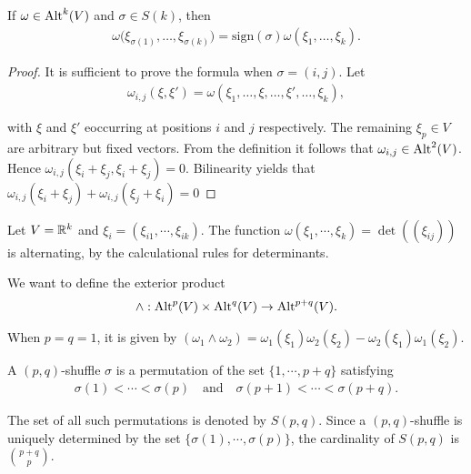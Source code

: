 \begin{lemma}
  If $\omega\in\operatorname{Alt}^k(V)$ and $\sigma\in S(k)$, then
  \begin{align*}
    \omega\big(\xi_{\sigma(1)},\ldots,\xi_{\sigma(k)}\big)=\mathrm{sign}(\sigma)\omega(\xi_{1},\ldots,\xi_{k}).
  \end{align*}
\end{lemma}

\begin{proof}
  It is sufficient to prove the formula when $\sigma = (i, j)$. Let
  \begin{align*}
    \omega_{i,j}(\xi,\xi')=\omega(\xi_{1},\ldots,\xi,\ldots,\xi',\ldots,\xi_{k}),
  \end{align*}

  with $\xi$ and $\xi'$ eoccurring at positions $i$ and $j$ respectively. The remaining $\xi_p\in V$
  are arbitrary but fixed vectors. From the definition it follows that $\omega_{i,j}\in\operatorname{Alt}^2(V)$.
  Hence $\omega_{i,j} (\xi_i + \xi_j, \xi_i + \xi_j) = 0$. Bilinearity yields that
  $\omega_{i,j} (\xi_i + \xi_j) + \omega_{i,j} (\xi_j + \xi_i) = 0$
\end{proof}


\begin{example}\label{example:2-3}
  Let $V = \mathbb{R}^k$ and $\xi_i = (\xi_{i1}, \cdots, \xi_{ik})$. The function $\omega(\xi_1, \cdots, \xi_k) = \det((\xi_{ij}))$
  is alternating, by the calculational rules for determinants.
\end{example}

We want to define the exterior product
\begin{align*}
  \wedge: \operatorname{Alt}^p(V)\times\operatorname{Alt}^q(V) \to \operatorname{Alt}^{p+q}(V).
\end{align*}

When $p=q=1$, it is given by $(\omega_1\wedge\omega_2) = \omega_1(\xi_1)\omega_2(\xi_2) - \omega_2(\xi_1)\omega_1(\xi_2)$.

\begin{definition}
  A $(p, q)$-shuffle $\sigma$ is a permutation of the set $\{1, \cdots, p + q\}$ satisfying
  \begin{align*}
    \sigma(1) < \cdots < \sigma(p) \quad\text{and}\quad \sigma(p + 1) < \cdots < \sigma(p + q).
  \end{align*}

  The set of all such permutations is denoted by $S(p, q)$. Since a $(p, q)$-shuffle is uniquely determined by the
  set $\{\sigma(1),\cdots,\sigma(p)\}$, the cardinality of $S(p, q)$ is $\binom{p + q}{p}$.
\end{definition}



